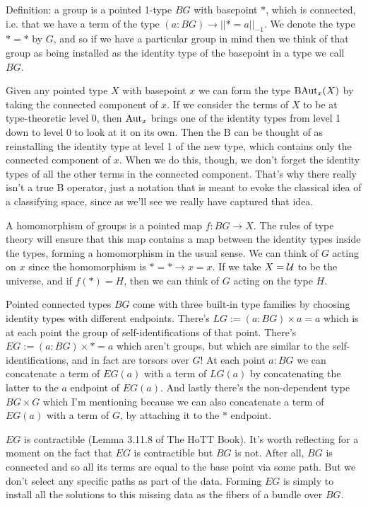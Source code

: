 \documentclass[14pt]{extarticle}
\begin{document}
Definition: a group is a pointed 1-type $BG$ with basepoint $*$, which is connected, i.e. that we have a term of the type $(a:BG)\to||*=a||_{-1}$. We denote the type $*=*$ by $G$, and so if we have a particular group in mind then we think of that group as being installed as the identity type of the basepoint in a type we call $BG$.

Given any pointed type $X$ with basepoint $x$ we can form the type $\mathrm{BAut}_x(X)$ by taking the connected component of $x$. If we consider the terms of $X$ to be at type-theoretic level 0, then $\mathrm{Aut}_x$ brings one of the identity types from level 1 down to level 0 to look at it on its own. Then the B can be thought of as reinstalling the identity type at level 1 of the new type, which contains only the connected component of $x$. When we do this, though, we don't forget the identity types of all the other terms in the connected component. That's why there really isn't a true B operator, just a notation that is meant to evoke the classical idea of a classifying space, since as we'll see we really have captured that idea.

A homomorphism of groups is a pointed map $f:BG\to X$. The rules of type theory will ensure that this map contains a map between the identity types inside the types, forming a homomorphism in the usual sense. We can think of $G$ acting on $x$ since the homomorphism is $*=*\to x=x$. If we take $X=\mathcal{U}$ to be the universe, and if $f(*)=H$, then we can think of $G$ acting on the type $H$.

Pointed connected types $BG$ come with three built-in type families by choosing identity types with different endpoints. There's $LG:=(a:BG)\times a=a$ which is at each point the group of self-identifications of that point. There's $EG:=(a:BG)\times *=a$ which aren't groups, but which are similar to the self-identifications, and in fact are torsors over $G$! At each point $a:BG$ we can concatenate a term of $EG(a)$ with a term of $LG(a)$ by concatenating the latter to the $a$ endpoint of $EG(a)$. And lastly there's the non-dependent type $BG\times G$ which I'm mentioning because we can also concatenate a term of $EG(a)$ with a term of $G$, by attaching it to the $*$ endpoint.

$EG$ is contractible (Lemma 3.11.8 of The HoTT Book\cite{hottbook}). It's worth reflecting for a moment on the fact that $EG$ is contractible but $BG$ is not. After all, $BG$ is connected and so all its terms are equal to the base point via some path. But we don't select any specific paths as part of the data. Forming $EG$ is simply to install all the solutions to this missing data as the fibers of a bundle over $BG$.
\end{document}
